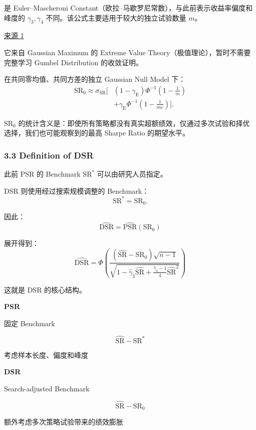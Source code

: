 是 Euler--Mascheroni Constant（欧拉--马歇罗尼常数），与此前表示收益率偏度和峰度的 \(\gamma_3,\gamma_4\) 不同。该公式主要适用于较大的独立试验数量 \(m\)。

\href{https://www.davidhbailey.com/dhbpapers/deflated-sharpe.pdf}{来源 1}

它来自 Gaussian Maximum 的 Extreme Value Theory（极值理论），暂时不需要完整学习 Gumbel Distribution 的收敛证明。

在共同零均值、共同方差的独立 Gaussian Null Model 下：
\[\boxed{
\begin{aligned}
\mathrm{SR}_0\approx
\sigma_{\mathrm{SR}}
\Bigg[
&(1-\gamma_{\mathrm E})
\Phi^{-1}\left(1-\frac1m\right)\\
&+\gamma_{\mathrm E}
\Phi^{-1}\left(1-\frac1{me}\right)
\Bigg].
\end{aligned}
}\]

\(\mathrm{SR}_0\) 的统计含义是：即使所有策略都没有真实超额绩效，仅通过多次试验和择优选择，我们也可能观察到的最高 Sharpe Ratio 的期望水平。

\hypertarget{part-4-71-0001-definition-of-dsr}{%
\subsubsection{3.3 Definition of DSR}\label{part-4-71-0001-definition-of-dsr}}

此前 PSR 的 Benchmark \(\mathrm{SR}^*\) 可以由研究人员指定。

DSR 则使用经过搜索规模调整的 Benchmark：
\[\mathrm{SR}^*=\mathrm{SR}_0.\]

因此：
\[\boxed{
\widehat{\mathrm{DSR}}
=
\widehat{\mathrm{PSR}}(\mathrm{SR}_0)
}\]

展开得到：
\[\boxed{
\widehat{\mathrm{DSR}}
=
\Phi\left(
\frac{
(\widehat{\mathrm{SR}}-\mathrm{SR}_0)\sqrt{n-1}
}{
\sqrt{
1-\hat\gamma_3\widehat{\mathrm{SR}}
+
\frac{\hat\gamma_4-1}{4}\widehat{\mathrm{SR}}^2
}
}
\right)
}\]

这就是 DSR 的核心结构。

\textbf{PSR}

固定 Benchmark

\[\widehat{\mathrm{SR}}-\mathrm{SR}^*\]

考虑样本长度、偏度和峰度

\textbf{DSR}

Search-adjusted Benchmark

\[\widehat{\mathrm{SR}}-\mathrm{SR}_0\]

额外考虑多次策略试验带来的绩效膨胀

